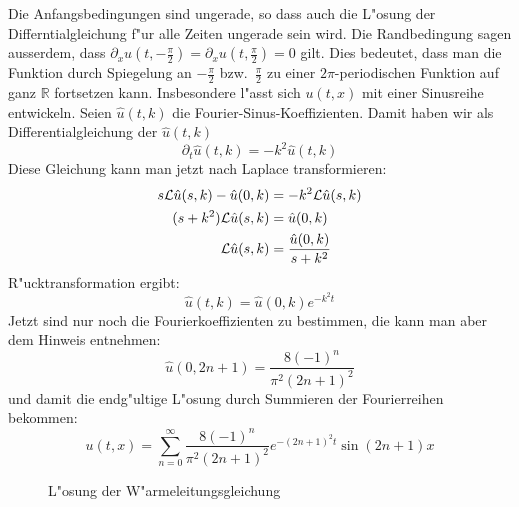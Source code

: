 {\begin{loesung}
Die Anfangsbedingungen sind ungerade, so dass auch die L"osung der
Differntialgleichung f"ur alle Zeiten ungerade sein wird. Die
Randbedingung sagen ausserdem, dass
$\partial_xu(t,-\frac{\pi}2)=\partial_xu(t,\frac{\pi}2)=0$ gilt.
Dies bedeutet, dass man die Funktion durch Spiegelung an
$-\frac{\pi}2$ bzw.~$\frac{\pi}2$ zu einer $2\pi$-periodischen
Funktion auf ganz $\mathbb R$ fortsetzen kann. Insbesondere l"asst
sich $u(t,x)$ mit einer Sinusreihe entwickeln. Seien $\hat u(t,k)$
die Fourier-Sinus-Koeffizienten. Damit haben wir als Differentialgleichung
der $\hat u(t,k)$
\[
\partial_t\hat u(t,k)=-k^2\hat u(t,k)
\]
Diese Gleichung kann man jetzt nach Laplace transformieren:
\begin{align*}
s{\cal L}\hat u(s,k) - \hat u(0,k)&=-k^2 {\cal L}\hat u(s,k)\\
(s+k^2){\cal L}\hat u(s,k)&=\hat u(0,k)\\
{\cal L}\hat u(s,k)&=\frac{\hat u(0,k)}{s+k^2}
\end{align*}
R"ucktransformation ergibt:
\[
\hat u(t,k)=\hat u(0,k) e^{-k^2t}
\]
Jetzt sind nur noch die Fourierkoeffizienten zu bestimmen, die kann
man aber dem Hinweis entnehmen:
\[
\hat u(0,2n+1)=
\frac{8(-1)^n}{\pi^2(2n+1)^2}
\]
und damit die endg"ultige L"osung durch Summieren der Fourierreihen bekommen:
\[
u(t,x)=
\sum_{n=0}^\infty \frac{8(-1)^n}{\pi^2(2n+1)^2}e^{-(2n+1)^2t}\sin(2n+1)x
\]
\begin{figure}
\begin{center}
\end{center}
\caption{L"osung der W"armeleitungsgleichung}
\end{figure}
\end{loesung}
}{}

